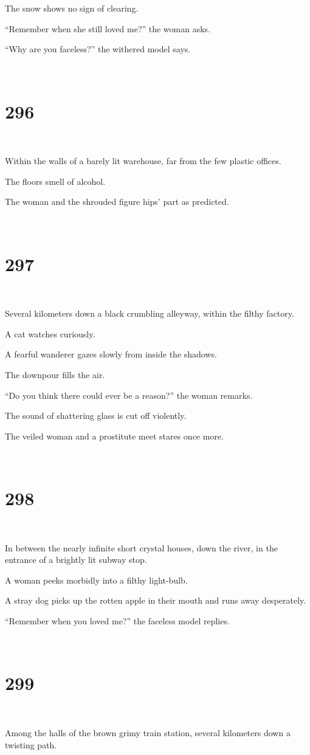 \documentclass{report}
\begin{document}
The snow shows no sign of clearing.

``Remember when she still loved me?'' the woman asks.

``Why are you faceless?'' the withered model says.

~
\chapter*{296}
~

Within the walls of a barely lit warehouse, far from the few plastic offices.

The floors smell of alcohol.

The woman and the shrouded figure hips' part as predicted.

~
\chapter*{297}
~

Several kilometers down a black crumbling alleyway, within the filthy factory.

A cat watches curiously.

A fearful wanderer gazes slowly from inside the shadows.

The downpour fills the air.

``Do you think there could ever be a reason?'' the woman remarks.

The sound of shattering glass is cut off violently.

The veiled woman and a prostitute meet stares once more.

~
\chapter*{298}
~

In between the nearly infinite short crystal houses, down the river, in the entrance of a brightly lit subway stop.

A woman peeks morbidly into a filthy light-bulb.

A stray dog picks up the rotten apple in their mouth and runs away desperately.

``Remember when you loved me?'' the faceless model replies.

~
\chapter*{299}
~

Among the halls of the brown grimy train station, several kilometers down a twisting path.
\end{document}
